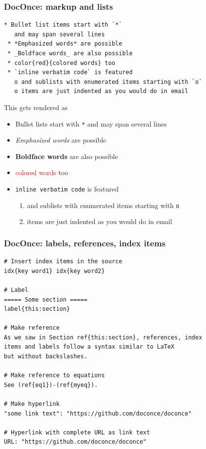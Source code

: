 \documentclass{beamer}
\newcounter{doconce:movie:counter}
\begin{document}
\begin{frame}
\frametitle{DocOnce: markup and lists}

\begin{Verbatim}[numbers=none,fontsize=\fontsize{9pt}{9pt},baselinestretch=0.95]
 * Bullet list items start with `*`
   and may span several lines
 * *Emphasized words* are possible
 * _Boldface words_ are also possible
 * color{red}{colored words} too
 * `inline verbatim code` is featured
   o and sublists with enumerated items starting with `o`
   o items are just indented as you would do in email

\end{Verbatim}

This gets rendered as
\begin{itemize}
 \item Bullet lists start with \texttt{*} and may span several lines
 \item \emph{Emphasized words} are possible
 \item \textbf{Boldface words} are also possible
 \item \textcolor{red}{colored words} too
 \item \texttt{inline verbatim code} is featured
\begin{enumerate}
  \item and sublists with enumerated items starting with \texttt{o}
  \item items are just indented as you would do in email
\end{enumerate}
\noindent
\end{itemize}
\noindent
\end{frame}

\begin{frame}
\frametitle{DocOnce: labels, references, index items}

\begin{verbatim}
# Insert index items in the source
idx{key word1} idx{key word2}

# Label
===== Some section =====
label{this:section}

# Make reference
As we saw in Section ref{this:section}, references, index
items and labels follow a syntax similar to LaTeX
but without backslashes.

# Make reference to equations
See (ref{eq1})-(ref{myeq}).

# Make hyperlink
"some link text": "https://github.com/doconce/doconce"

# Hyperlink with complete URL as link text
URL: "https://github.com/doconce/doconce"

\end{verbatim}
\end{frame}
\end{document}
